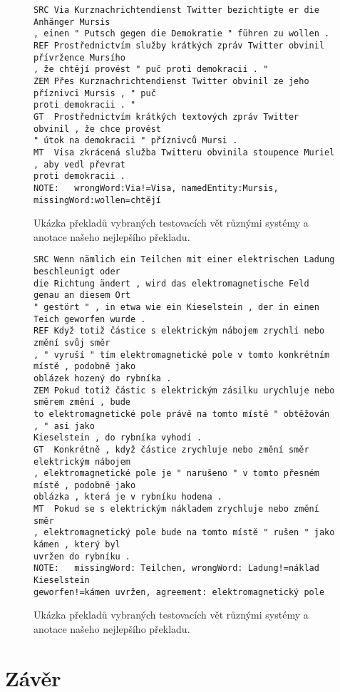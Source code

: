 \documentclass[a4]{article}
\begin{document}
\begin{figure}[t]
\centering
\begin{verbatim}
SRC Via Kurznachrichtendienst Twitter bezichtigte er die Anhänger Mursis
, einen " Putsch gegen die Demokratie " führen zu wollen .
REF Prostřednictvím služby krátkých zpráv Twitter obvinil přívržence Mursího
, že chtějí provést " puč proti demokracii . "
ZEM Přes Kurznachrichtendienst Twitter obvinil ze jeho příznivci Mursis , " puč
proti demokracii . "
GT  Prostřednictvím krátkých textových zpráv Twitter obvinil , že chce provést
" útok na demokracii " příznivců Mursi .
MT  Visa zkrácená služba Twitteru obvinila stoupence Muriel , aby vedl převrat
proti demokracii .
NOTE:   wrongWord:Via!=Visa, namedEntity:Mursis, missingWord:wollen=chtějí
\end{verbatim}
\caption{Ukázka překladů vybraných testovacích vět různými systémy a anotace našeho nejlepšího překladu.}
\label{fig:preklad2}
\end{figure}

\begin{figure}[t]
\centering
\begin{verbatim}
SRC Wenn nämlich ein Teilchen mit einer elektrischen Ladung beschleunigt oder
die Richtung ändert , wird das elektromagnetische Feld genau an diesem Ort
" gestört " , in etwa wie ein Kieselstein , der in einen Teich geworfen wurde .
REF Když totiž částice s elektrickým nábojem zrychlí nebo změní svůj směr
, " vyruší " tím elektromagnetické pole v tomto konkrétním místě , podobně jako
oblázek hozený do rybníka .
ZEM Pokud totiž částic s elektrickým zásilku urychluje nebo směrem změní , bude
to elektromagnetické pole právě na tomto místě " obtěžován , " asi jako
Kieselstein , do rybníka vyhodí .
GT  Konkrétně , když částice zrychluje nebo změní směr elektrickým nábojem
, elektromagnetické pole je " narušeno " v tomto přesném místě , podobně jako
oblázka , která je v rybníku hodena .
MT  Pokud se s elektrickým nákladem zrychluje nebo změní směr
, elektromagnetický pole bude na tomto místě " rušen " jako kámen , který byl
uvržen do rybníku .
NOTE:   missingWord: Teilchen, wrongWord: Ladung!=náklad Kieselstein
geworfen!=kámen uvržen, agreement: elektromagnetický pole
\end{verbatim}
\caption{Ukázka překladů vybraných testovacích vět různými systémy a anotace našeho nejlepšího překladu.}
\label{fig:preklad3}
\end{figure}



\section{Závěr}
\end{document}
